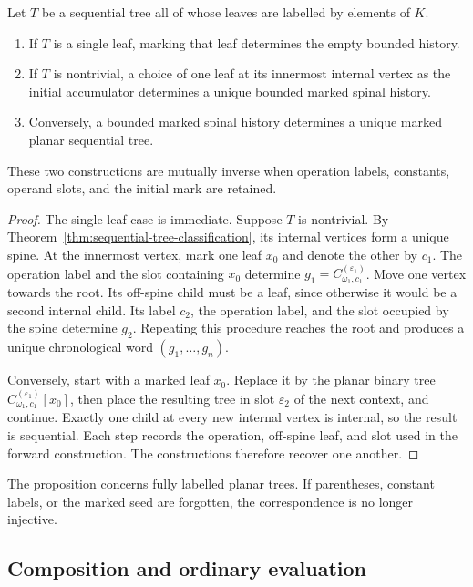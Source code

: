 \begin{proposition}
\label{prop:marked-tree-history-correspondence}
Let $T$ be a sequential tree all of whose leaves are labelled by elements of
$K$.
\begin{enumerate}
  \item If $T$ is a single leaf, marking that leaf determines the empty bounded
  history.
  \item If $T$ is nontrivial, a choice of one leaf at its innermost internal
  vertex as the initial accumulator determines a unique bounded marked spinal
  history.
  \item Conversely, a bounded marked spinal history determines a unique marked
  planar sequential tree.
\end{enumerate}
These two constructions are mutually inverse when operation labels, constants,
operand slots, and the initial mark are retained.
\end{proposition}

\begin{proof}
The single-leaf case is immediate.  Suppose $T$ is nontrivial.  By
Theorem~\ref{thm:sequential-tree-classification}, its internal vertices form a
unique spine.  At the innermost vertex, mark one leaf $x_0$ and denote the
other by $c_1$.  The operation label and the slot containing $x_0$ determine
$g_1=C_{\omega_1,c_1}^{(\varepsilon_1)}$.  Move one vertex towards the root.
Its off-spine child must be a leaf, since otherwise it would be a second
internal child.  Its label $c_2$, the operation label, and the slot occupied by
the spine determine $g_2$.  Repeating this procedure reaches the root and
produces a unique chronological word $(g_1,\ldots,g_n)$.

Conversely, start with a marked leaf $x_0$.  Replace it by the planar binary
tree $C_{\omega_1,c_1}^{(\varepsilon_1)}[x_0]$, then place the resulting tree
in slot $\varepsilon_2$ of the next context, and continue.  Exactly one child
at every new internal vertex is internal, so the result is sequential.  Each
step records the operation, off-spine leaf, and slot used in the forward
construction.  The constructions therefore recover one another.
\end{proof}

The proposition concerns fully labelled planar trees.  If parentheses,
constant labels, or the marked seed are forgotten, the correspondence is no
longer injective.

\subsection{Composition and ordinary evaluation}

